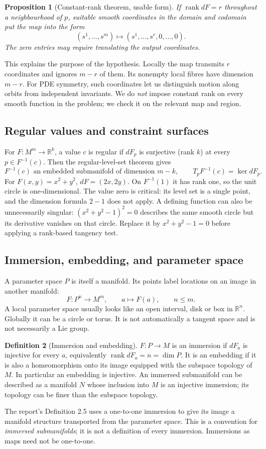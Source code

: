 \documentclass[11pt,a4paper]{article}
\numberwithin{equation}{section}
\theoremstyle{definition}
\newtheorem{definition}{Definition}[section]
\theoremstyle{plain}
\newtheorem{proposition}[definition]{Proposition}
\theoremstyle{remark}
\newcommand{\R}{\mathbb R}
\newcommand{\rank}{\operatorname{rank}}
\begin{document}
\begin{proposition}[Constant-rank theorem, usable form]
If $\rank dF=r$ throughout a neighbourhood of $p$, suitable smooth coordinates in the domain and codomain put the map into the form
\[
(s^1,\ldots,s^m)\longmapsto(s^1,\ldots,s^r,0,\ldots,0).
\]
The zero entries may require translating the output coordinates.
\end{proposition}
This explains the purpose of the hypothesis. Locally the map transmits $r$ coordinates and ignores $m-r$ of them. Its nonempty local fibres have dimension $m-r$. For PDE symmetry, such coordinates let us distinguish motion along orbits from independent invariants. We do \emph{not} impose constant rank on every smooth function in the problem; we check it on the relevant map and region.

\subsection{Regular values and constraint surfaces}\label{sec:levelsets}
For $F:M^m\to\R^k$, a value $c$ is regular if $dF_p$ is surjective (rank $k$) at every $p\in F^{-1}(c)$. Then the regular-level-set theorem gives
\[
F^{-1}(c)\text{ an embedded submanifold of dimension }m-k,
\qquad T_pF^{-1}(c)=\ker dF_p.
\]
For $F(x,y)=x^2+y^2$, $dF=(2x,2y)$. On $F^{-1}(1)$ it has rank one, so the unit circle is one-dimensional. The value zero is critical: its level set is a single point, and the dimension formula $2-1$ does not apply. A defining function can also be unnecessarily singular: $(x^2+y^2-1)^2=0$ describes the same smooth circle but its derivative vanishes on that circle. Replace it by $x^2+y^2-1=0$ before applying a rank-based tangency test.

\subsection{Immersion, embedding, and parameter space}\label{sec:immersion}
A parameter space $P$ is itself a manifold. Its points label locations on an image in another manifold:
\[
F:P^n\longrightarrow M^m,\qquad a\longmapsto F(a),\qquad n\le m.
\]
A local parameter space usually looks like an open interval, disk or box in $\R^n$. Globally it can be a circle or torus. It is not automatically a tangent space and is not necessarily a Lie group.

\begin{definition}[Immersion and embedding]
$F:P\to M$ is an immersion if $dF_a$ is injective for every $a$, equivalently $\rank dF_a=n=\dim P$. It is an embedding if it is also a homeomorphism onto its image equipped with the subspace topology of $M$. In particular an embedding is injective. An immersed submanifold can be described as a manifold $N$ whose inclusion into $M$ is an injective immersion; its topology can be finer than the subspace topology.
\end{definition}
The report's Definition 2.5 uses a one-to-one immersion to give its image a manifold structure transported from the parameter space. This is a convention for \emph{immersed submanifolds}; it is not a definition of every immersion. Immersions as maps need not be one-to-one.
\end{document}
